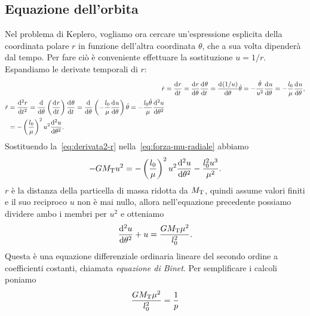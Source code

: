 \subsection{Equazione dell'orbita}
\label{sec:equazione-dellorbita}

Nel problema di Keplero, vogliamo ora cercare un'espressione esplicita della
coordinata polare $r$ in funzione dell'altra coordinata $\theta$, che a sua
volta dipenderà dal tempo. Per fare ciò è conveniente effettuare la sostituzione
$u=1/r$. Espandiamo le derivate temporali di $r$:
\begin{subequations}
  \begin{align}
    \dot{r} &= \toder{r}{t} = \toder{r}{\theta}\toder{\theta}{t} =
    \toder{(1/u)}{\theta}\dot{\theta} =
    -\frac{\dot{\theta}}{u^2}\toder{u}{\theta}
    = -\frac{l_0}{\mu}\toder{u}{\theta}, \label{eq:derivata1-r}\\
    \begin{split}
      \ddot{r} &= \toder[2]{r}{t} = \toder{}{\theta} \left( \toder{r}{t}
      \right)\toder{\theta}{t} = \toder{}{\theta} \left(
        -\frac{l_0}{\mu}\toder{u}{\theta} \right)\dot{\theta} =
      -\frac{l_0\dot{\theta}}{\mu}\toder[2]{u}{\theta} \\
      &= - \left(
        \frac{l_0}{\mu} \right)^2u^2\toder[2]{u}{\theta}. \label{eq:derivata2-r}
    \end{split}
  \end{align}
\end{subequations}
Sostituendo la~\eqref{eq:derivata2-r} nella~\eqref{eq:forza-mu-radiale} abbiamo
\begin{equation}
  -GM_\textup{T}u^2 = -
  \left(
    \frac{l_0}{\mu}
  \right)^2u^2\toder[2]{u}{\theta} - \frac{l_0^2u^3}{\mu^2}.
\end{equation}
$r$ è la distanza della particella di massa ridotta da $M_\textup{T}$, quindi
assume valori finiti e il suo reciproco $u$ non è mai nullo, allora
nell'equazione precedente possiamo dividere ambo i membri per $u^2$ e otteniamo
\begin{equation}
  \toder[2]{u}{\theta} + u = \frac{GM_\textup{T}\mu^2}{l_0^2}.
\end{equation}
Questa è una equazione differenziale ordinaria lineare del secondo ordine a
coefficienti costanti, chiamata \emph{equazione di Binet}. Per semplificare i
calcoli poniamo
\begin{equation}
  \label{eq:reciproco-semilato}
  \frac{GM_\textup{T}\mu^2}{l_0^2} = \frac{1}{p}
\end{equation}

